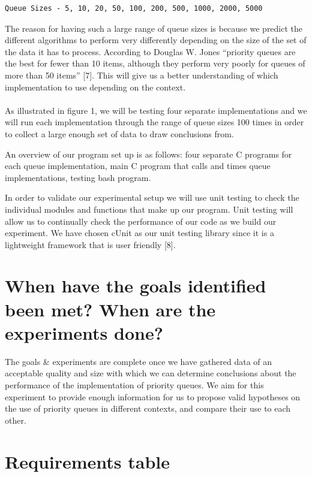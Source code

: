 \documentclass[12pt]{article}
\begin{document}
\begin{verbatim}
Queue Sizes - 5, 10, 20, 50, 100, 200, 500, 1000, 2000, 5000
\end{verbatim}

The reason for having such a large range of queue sizes is because we predict the different algorithms to perform very differently depending on the size of the set of the data it has to process. According to Douglas W. Jones “priority queues are the best for fewer than 10 items, although they perform very poorly for queues of more than 50 items” [7]. This will give us a better understanding of which implementation to use depending on the context.
\\
\\
As illustrated in figure 1, we will be testing four separate implementations and we will run each implementation through the range of queue sizes 100 times in order to collect a large enough set of data to draw conclusions from. 

An overview of our program set up is as follows:  four separate C programs for each queue implementation, main C program that calls and times queue implementations, testing bash program.

In order to validate our experimental setup we will use unit testing to check the individual modules and functions that make up our program. Unit testing will allow us to continually check the performance of our code as we build our experiment. We have chosen cUnit as our unit testing library since it is a lightweight framework that is user friendly [8].


\section{When have the goals identified been met? When are the experiments done?}

The goals \& experiments are complete once we have gathered data of an acceptable quality and size with which we can determine conclusions about the performance of the implementation of priority queues. We aim for this experiment to provide enough information for us to propose valid hypotheses on the use of priority queues in different contexts, and compare their use to each other.

\section{Requirements table}
\end{document}
